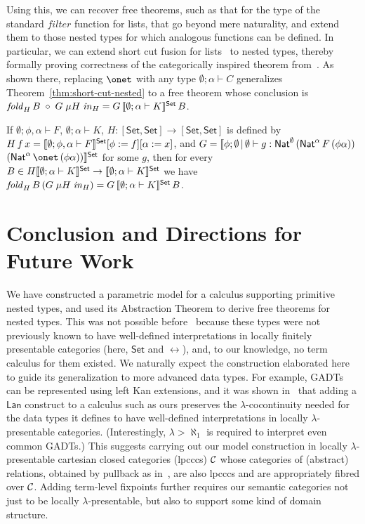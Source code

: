 \documentclass[runningheads]{llncs}
\newcommand{\set}{\mathsf{Set}}
\begin{document}
Using this, we can recover free theorems, such as that for the type of
the standard $\mathit{filter}$ function for lists, that go beyond mere
naturality, and extend them to those nested types for which analogous
functions can be defined. In particular, we can extend short cut
fusion for lists~\cite{glp93} to nested types, thereby formally
proving correctness of the categorically inspired theorem
from~\cite{jg10}. As shown there, replacing $\onet$ with any type
$\emptyset;\alpha \vdash C$ generalizes
Theorem~\ref{thm:short-cut-nested} to a free theorem whose conclusion
is $\mathit{fold}_{H}\, B \; \circ \; G\; \mu H \; \mathit{in}_{H} = G
\,\setsem{\emptyset;\alpha \vdash K}\, B$.
\begin{theorem}\label{thm:short-cut-nested}
If $\emptyset;\phi,\alpha \vdash F$, $\emptyset; \alpha
\vdash K$, 
$H : [\set,\set] \to [\set,\set]$ is defined by $H\,f\,x =
\setsem{\emptyset; \phi, \alpha \vdash F}[\phi := f][\alpha := x]$,
and $G = \llbracket \phi;\emptyset\,|\,\emptyset \vdash g :
\mathsf{Nat}^\emptyset\,(\mathsf{Nat}^\alpha\,F\,(\phi\alpha))$ \\
\noindent $(\Nat^\alpha\,\onet \, (\phi\alpha)) \rrbracket^\set$ for
some $g$, then for every $B \in H \setsem{\emptyset;\alpha \vdash K}
\rightarrow \setsem{\emptyset; \alpha \vdash K}$ we have
$\mathit{fold}_{H}\, B \, (G\; \mu H \; \mathit{in}_{H}) = G
\,\setsem{\emptyset;\alpha \vdash K}\, B$.
\end{theorem}

\vspace*{-0.15in}

\section{Conclusion and Directions for Future Work}\label{sec:conclusion}

\vspace*{-0.1in}

We have constructed a parametric model for a calculus supporting
primitive nested types, and used its Abstraction Theorem to derive
free theorems for nested types.  This was not possible
before~\cite{jp19} because these types were not previously known to
have well-defined interpretations in locally finitely presentable
categories (here, $\set$ and $\rel$), and, to our knowledge, no term
calculus for them existed.  We naturally expect the construction
elaborated here to guide its generalization to more advanced data
types.  For example, GADTs can be represented using left Kan
extensions, and it was shown in~\cite{jp19} that adding a
$\mathsf{Lan}$ construct to a calculus such as ours preserves the
$\lambda$-cocontinuity needed for the data types it defines to have
well-defined interpretations in locally $\lambda$-presentable
categories. (Interestingly, $\lambda > \aleph_1$ is required to
interpret even common GADTs.) This suggests carrying out our model
construction in locally $\lambda$-presentable cartesian closed
categories (lpcccs) $\cal C$ whose categories of (abstract) relations,
obtained by pullback as in~\cite{jac99}, are also lpcccs and are
appropriately fibred over $\cal C$.  Adding term-level fixpoints
further requires our semantic categories not just to be locally
$\lambda$-presentable, but also to support some kind of domain
structure.
\end{document}
